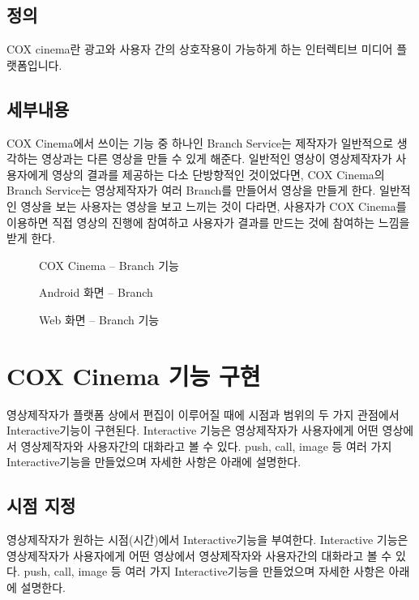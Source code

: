 \subsection{정의}

COX cinema란 광고와 사용자 간의 상호작용이 가능하게 하는 인터렉티브 미디어 플랫폼입니다. 	


\subsection{ 세부내용}

COX Cinema에서 쓰이는 기능 중 하나인 Branch Service는 제작자가 일반적으로 생각하는 영상과는 다른 영상을 만들 수 있게 해준다. 일반적인 영상이 영상제작자가 사용자에게 영상의 결과를 제공하는 다소 단방향적인 것이었다면, COX Cinema의 Branch Service는 영상제작자가 여러 Branch를 만들어서 영상을 만들게 한다. 일반적인 영상을 보는 사용자는 영상을 보고 느끼는 것이 다라면, 사용자가 COX Cinema를 이용하면 직접 영상의 진행에 참여하고 사용자가 결과를 만드는 것에 참여하는 느낌을 받게 한다.     

\begin{figure}[h!]
\centering
\caption{COX Cinema – Branch 기능}
\end{figure}

\begin{figure}[h!]
\centering
\caption{Android 화면 – Branch }
\end{figure}

\begin{figure}[h!]
\centering
\caption{Web 화면 – Branch 기능}
\end{figure}


\section{ COX Cinema 기능 구현}
영상제작자가 플랫폼 상에서 편집이 이루어질 때에 시점과 범위의 두 가지 관점에서 Interactive기능이 구현된다. Interactive 기능은 영상제작자가 사용자에게 어떤 영상에서 영상제작자와 사용자간의 대화라고 볼 수 있다. push, call, image 등 여러 가지 Interactive기능을 만들었으며 자세한 사항은 아래에 설명한다.  

\subsection{시점 지정}

영상제작자가 원하는 시점(시간)에서 Interactive기능을 부여한다. Interactive 기능은 영상제작자가 사용자에게 어떤 영상에서 영상제작자와 사용자간의 대화라고 볼 수 있다. push, call, image 등 여러 가지 Interactive기능을 만들었으며 자세한 사항은 아래에 설명한다.  

